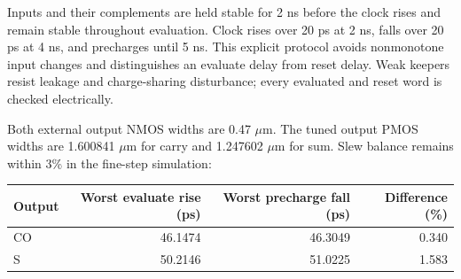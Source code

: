 \documentclass[11pt]{article}
\begin{document}
Inputs and their complements are held stable for 2 ns before the clock rises and remain stable throughout evaluation. Clock rises over 20 ps at 2 ns, falls over 20 ps at 4 ns, and precharges until 5 ns. This explicit protocol avoids nonmonotone input changes and distinguishes an evaluate delay from reset delay. Weak keepers resist leakage and charge-sharing disturbance; every evaluated and reset word is checked electrically.

Both external output NMOS widths are 0.47 $\mu$m. The tuned output PMOS widths are 1.600841 $\mu$m for carry and 1.247602 $\mu$m for sum. Slew balance remains within 3\% in the fine-step simulation:
\begin{center}\begin{tabular}{lrrr}\toprule Output&Worst evaluate rise (ps)&Worst precharge fall (ps)&Difference (\%)\\\midrule
CO&46.1474&46.3049&0.340\\
S&50.2146&51.0225&1.583\\
\bottomrule\end{tabular}\end{center}
\end{document}
